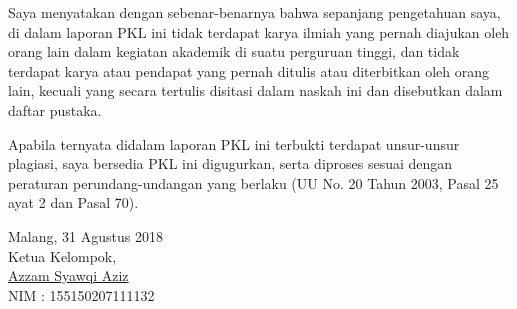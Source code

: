 \documentclass{pkl}
\begin{document}
\cover

\approvalpage



{\orisinalitas

  Saya menyatakan dengan sebenar-benarnya bahwa sepanjang pengetahuan
  saya, di dalam laporan PKL ini tidak terdapat karya ilmiah yang
  pernah diajukan oleh orang lain dalam kegiatan akademik di suatu
  perguruan tinggi, dan tidak terdapat karya atau pendapat yang pernah
  ditulis atau diterbitkan oleh orang lain, kecuali yang secara
  tertulis disitasi dalam naskah ini dan disebutkan dalam daftar
  pustaka.

  Apabila ternyata didalam laporan PKL ini terbukti terdapat
  unsur-unsur plagiasi, saya bersedia PKL ini digugurkan, serta
  diproses sesuai dengan peraturan perundang-undangan yang berlaku (UU
  No. 20 Tahun 2003, Pasal 25 ayat 2 dan Pasal 70).
  \vspace{1.5cm}

  \noindent
  \hspace*{8cm}Malang, 31 Agustus 2018  \\
  \hspace*{8cm}Ketua Kelompok,  \vspace{1.5cm} \\

  \hspace*{6.8cm}\underline{Azzam Syawqi Aziz} \\
  \hspace*{8cm}NIM : 155150207111132

}
\end{document}
